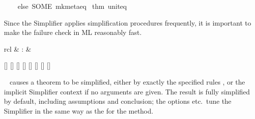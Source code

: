 \begin{isabellebody}
\ \ \ \ else\ SOME\ {}mk{}meta{}eq\ %
\isaantiq
thm\ unit{}eq{}%
\endisaantiq
{}\isanewline
{}%
\endisatagML
{\isafoldML}%
%
\isadelimML
%
\endisadelimML
%
\begin{isamarkuptext}%
Since the Simplifier applies simplification procedures
  frequently, it is important to make the failure check in ML
  reasonably fast.%
\end{isamarkuptext}%
\isamarkuptrue%
%
\isamarkuptrue%
%
\begin{isamarkuptext}%
\begin{matharray}{rcl}
    \hypertarget{attribute.simplified}{\hyperlink{attribute.simplified}{\mbox{}}} & : &  \\
  \end{matharray}

  \begin{railoutput}
[]
\rail@bar
{}
[]
\rail@endbar
\rail@bar
{}
[]
\rail@endbar
\rail@end
{}
[]
\rail@bar
{}[]
[]
[]
\rail@endbar
{}[]
\rail@end
\end{railoutput}


  \begin{description}
  
  \item \hyperlink{attribute.simplified}{\mbox{}}~ causes a theorem to
  be simplified, either by exactly the specified rules , or the implicit Simplifier context if no arguments are given.
  The result is fully simplified by default, including assumptions and
  conclusion; the options  etc.\ tune the Simplifier in
  the same way as the for the  method.


\end{description}
\end{isamarkuptext}
\end{isabellebody}
